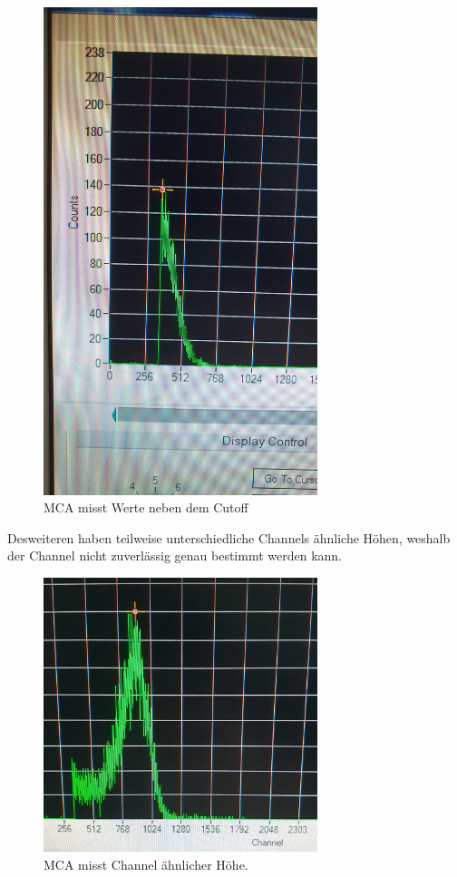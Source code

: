 \begin{figure}[H]
    \includegraphics[width=8cm]{./content/Filter.jpg}
    \caption{MCA misst Werte neben dem Cutoff}
\end{figure}

\noindent Desweiteren haben teilweise unterschiedliche Channels ähnliche Höhen, weshalb der Channel nicht zuverlässig 
genau bestimmt werden kann. 

\begin{figure}[H]
    \includegraphics[width=8cm]{./content/samepeaks.jpg}
    \caption{MCA misst Channel ähnlicher Höhe.}
\end{figure}

